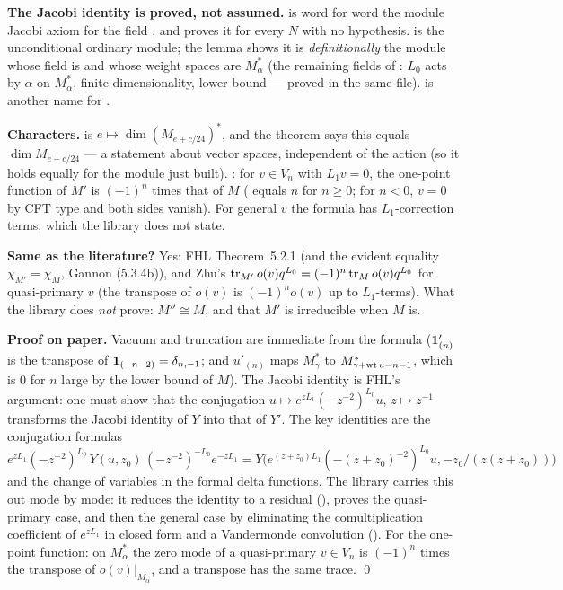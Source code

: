 \begin{dictionary}
\textbf{The Jacobi identity is proved, not assumed.}  is word for word the module
Jacobi axiom for the field , and  proves it for every $N$ with no
hypothesis.  is the unconditional ordinary module; the  lemma
\allowbreak{}\allowbreak{} shows it is \emph{definitionally} the module whose field is 
and whose weight spaces are $M_\alpha^*$ (the remaining fields of : $L_0$ acts by $\alpha$
on $M_\alpha^*$, finite-dimensionality, lower bound --- proved in the same file).
 is another name for .

\textbf{Characters.}  is $e\mapsto\dim(M_{e+c/24})^*$, and the theorem says this equals
$\dim M_{e+c/24}$ --- a statement about vector spaces, independent of the action (so it holds equally for the module just
built). \allowbreak{}\allowbreak{}: for $v\in V_n$ with $L_1v = 0$, the one-point function of $M'$ is
$(-1)^n$ times that of $M$ ( equals $n$ for $n\ge0$; for $n<0$, $v = 0$ by CFT type and both sides vanish).
For general $v$ the formula has $L_1$-correction terms, which the library does not state.

\textbf{Same as the literature?} Yes: FHL Theorem~5.2.1 (and the evident equality $\chi_{M'} = \chi_M$, Gannon (5.3.4b)), and Zhu's
$\operatorname{tr}_{M'}o(v)q^{L_0} = (-1)^n\operatorname{tr}_Mo(v)q^{L_0}$ for quasi-primary $v$ (the transpose of $o(v)$ is $(-1)^n o(v)$ up to
$L_1$-terms). What the library does \emph{not} prove: $M''\cong M$, and that $M'$ is irreducible when $M$ is.
\end{dictionary}

\textbf{Proof on paper.} Vacuum and truncation are immediate from the formula ($\mathbf{1}'_{(n)}$ is the transpose of
$\mathbf{1}_{(-n-2)} = \delta_{n,-1}$; and $u'_{(n)}$ maps $M_\gamma^*$ to $M^*_{\gamma+\operatorname{wt} u-n-1}$, which is $0$ for $n$ large by the
lower bound of $M$). The Jacobi identity is FHL's argument: one must show that the conjugation
$u\mapsto e^{zL_1}(-z^{-2})^{L_0}u$, $z\mapsto z^{-1}$ transforms the Jacobi identity of $Y$ into that of $Y'$. The key
identities are the conjugation formulas $e^{zL_1}(-z^{-2})^{L_0}\,Y(u,z_0)\,(-z^{-2})^{-L_0}e^{-zL_1} =
Y\big(e^{(z+z_0)L_1}(-(z+z_0)^{-2})^{L_0}u, -z_0/(z(z+z_0))\big)$ and the change of variables in the formal delta
functions. The library carries this out mode by mode: it reduces the identity to a residual (),
proves the quasi-primary case, and then the general case by eliminating the comultiplication coefficient of
$e^{zL_1}$ in closed form and a Vandermonde convolution (). For the one-point
function: on $M_\alpha^*$ the zero mode of a quasi-primary $v\in V_n$ is $(-1)^n$ times the transpose of $o(v)|_{M_\alpha}$,
and a transpose has the same trace. \qed


